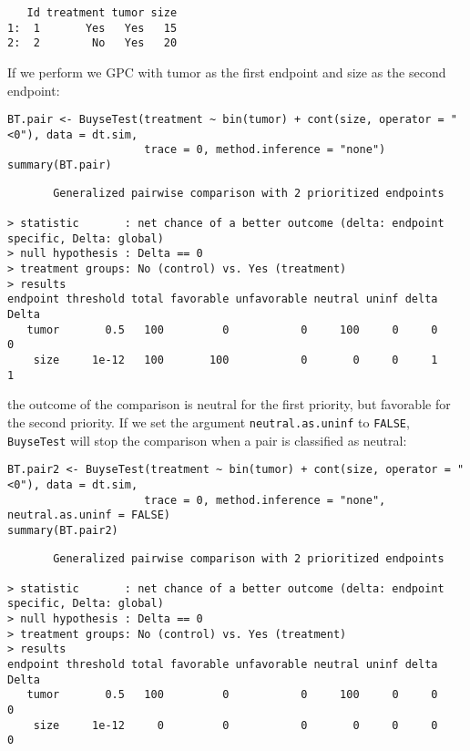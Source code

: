 \documentclass[12pt]{article}
\begin{document}
\begin{verbatim}
   Id treatment tumor size
1:  1       Yes   Yes   15
2:  2        No   Yes   20
\end{verbatim}

If we perform we GPC with tumor as the first endpoint and size as the
second endpoint:
\lstset{language=r,label= ,caption= ,captionpos=b,numbers=none}
\begin{lstlisting}
BT.pair <- BuyseTest(treatment ~ bin(tumor) + cont(size, operator = "<0"), data = dt.sim,
					 trace = 0, method.inference = "none")
summary(BT.pair)
\end{lstlisting}

\begin{verbatim}
       Generalized pairwise comparison with 2 prioritized endpoints

> statistic       : net chance of a better outcome (delta: endpoint specific, Delta: global) 
> null hypothesis : Delta == 0 
> treatment groups: No (control) vs. Yes (treatment) 
> results
endpoint threshold total favorable unfavorable neutral uninf delta Delta
   tumor       0.5   100         0           0     100     0     0     0
    size     1e-12   100       100           0       0     0     1     1
\end{verbatim}

the outcome of the comparison is neutral for the first priority, but
favorable for the second priority. If we set the argument
\texttt{neutral.as.uninf} to \texttt{FALSE}, \texttt{BuyseTest} will stop the comparison
when a pair is classified as neutral:
\lstset{language=r,label= ,caption= ,captionpos=b,numbers=none}
\begin{lstlisting}
BT.pair2 <- BuyseTest(treatment ~ bin(tumor) + cont(size, operator = "<0"), data = dt.sim,
					 trace = 0, method.inference = "none", neutral.as.uninf = FALSE)
summary(BT.pair2)
\end{lstlisting}

\begin{verbatim}
       Generalized pairwise comparison with 2 prioritized endpoints

> statistic       : net chance of a better outcome (delta: endpoint specific, Delta: global) 
> null hypothesis : Delta == 0 
> treatment groups: No (control) vs. Yes (treatment) 
> results
endpoint threshold total favorable unfavorable neutral uninf delta Delta
   tumor       0.5   100         0           0     100     0     0     0
    size     1e-12     0         0           0       0     0     0     0
\end{verbatim}
\end{document}
